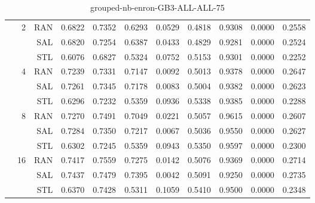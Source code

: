 \begin{center}
\begin{table}[htbp]
\begin{center}
\begin{tabular}{ | r | r | r | r | r | r | r | r | r | r | r |}
 & \multirow{3}{*}{2} & RAN & 0.6822 & 0.7352 & 0.6293 & 0.0529 & 0.4818 & 0.9308 & 0.0000 & 0.2558\\ \cline{3-11}
 &   & SAL & 0.6820 & 0.7254 & 0.6387 & 0.0433 & 0.4829 & 0.9281 & 0.0000 & 0.2524\\ \cline{3-11}
 &   & STL & 0.6076 & 0.6827 & 0.5324 & 0.0752 & 0.5153 & 0.9301 & 0.0000 & 0.2252\\ \cline{2-11}
 & \multirow{3}{*}{4} & RAN & 0.7239 & 0.7331 & 0.7147 & 0.0092 & 0.5013 & 0.9378 & 0.0000 & 0.2647\\ \cline{3-11}
 &   & SAL & 0.7261 & 0.7345 & 0.7178 & 0.0083 & 0.5004 & 0.9382 & 0.0000 & 0.2623\\ \cline{3-11}
 &   & STL & 0.6296 & 0.7232 & 0.5359 & 0.0936 & 0.5338 & 0.9385 & 0.0000 & 0.2288\\ \cline{2-11}
 & \multirow{3}{*}{8} & RAN & 0.7270 & 0.7491 & 0.7049 & 0.0221 & 0.5057 & 0.9615 & 0.0000 & 0.2607\\ \cline{3-11}
 &   & SAL & 0.7284 & 0.7350 & 0.7217 & 0.0067 & 0.5036 & 0.9550 & 0.0000 & 0.2627\\ \cline{3-11}
 &   & STL & 0.6302 & 0.7245 & 0.5359 & 0.0943 & 0.5350 & 0.9597 & 0.0000 & 0.2300\\ \cline{2-11}
 & \multirow{3}{*}{16} & RAN & 0.7417 & 0.7559 & 0.7275 & 0.0142 & 0.5076 & 0.9369 & 0.0000 & 0.2714\\ \cline{3-11}
 &   & SAL & 0.7437 & 0.7479 & 0.7395 & 0.0042 & 0.5091 & 0.9250 & 0.0000 & 0.2735\\ \cline{3-11}
 &   & STL & 0.6370 & 0.7428 & 0.5311 & 0.1059 & 0.5410 & 0.9500 & 0.0000 & 0.2348\\ \cline{2-11}
\hline
\end{tabular}
\caption{grouped-nb-enron-GB3-ALL-ALL-75}
\end{center}
 \end{table}
\end{center}

